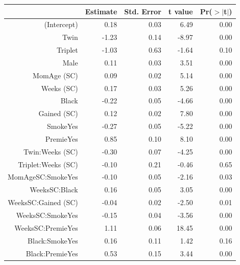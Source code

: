 \documentclass{article}\usepackage[]{graphicx}\usepackage[]{xcolor}
\begin{document}
\begin{enumerate}[a.]
\begin{enumerate}[i.]
\begin{table}[H]
\centering
\begin{tabular}{rrrrr}
  \hline
 & Estimate & Std. Error & t value & Pr($>$$|$t$|$) \\ 
  \hline
(Intercept) & 0.18 & 0.03 & 6.49 & 0.00 \\ 
  Twin & -1.23 & 0.14 & -8.97 & 0.00 \\ 
  Triplet & -1.03 & 0.63 & -1.64 & 0.10 \\ 
  Male & 0.11 & 0.03 & 3.51 & 0.00 \\ 
  MomAge (SC) & 0.09 & 0.02 & 5.14 & 0.00 \\ 
  Weeks (SC) & 0.17 & 0.03 & 5.26 & 0.00 \\ 
  Black & -0.22 & 0.05 & -4.66 & 0.00 \\ 
  Gained (SC) & 0.12 & 0.02 & 7.80 & 0.00 \\ 
  SmokeYes & -0.27 & 0.05 & -5.22 & 0.00 \\ 
  PremieYes & 0.85 & 0.10 & 8.10 & 0.00 \\ 
  Twin:Weeks (SC) & -0.30 & 0.07 & -4.25 & 0.00 \\ 
  Triplet:Weeks (SC) & -0.10 & 0.21 & -0.46 & 0.65 \\ 
  MomAgeSC:SmokeYes & -0.10 & 0.05 & -2.16 & 0.03 \\ 
  WeeksSC:Black & 0.16 & 0.05 & 3.05 & 0.00 \\ 
  WeeksSC:Gained (SC) & -0.04 & 0.02 & -2.50 & 0.01 \\ 
  WeeksSC:SmokeYes & -0.15 & 0.04 & -3.56 & 0.00 \\ 
  WeeksSC:PremieYes & 1.11 & 0.06 & 18.45 & 0.00 \\ 
  Black:SmokeYes & 0.16 & 0.11 & 1.42 & 0.16 \\ 
  Black:PremieYes & 0.53 & 0.15 & 3.44 & 0.00 \\ 
   \hline
\end{tabular}
\end{table}


\end{enumerate}
\end{enumerate}
\end{document}
